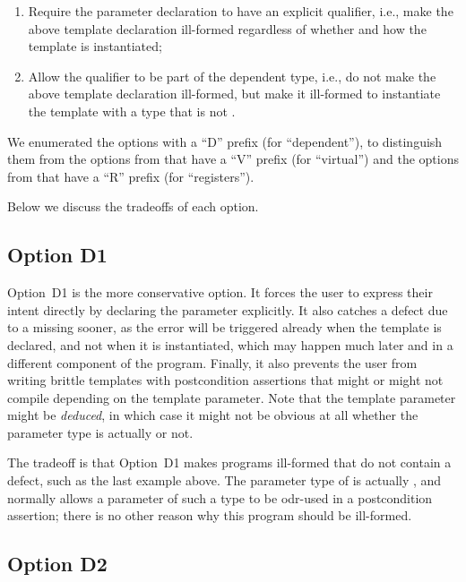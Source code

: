 \begin{enumerate}
\item Require the parameter declaration to have an explicit  qualifier, i.e., make the above template declaration ill-formed regardless of whether and how the template is instantiated;
\item Allow the  qualifier to be part of the dependent type, i.e., do not make the above template declaration ill-formed, but make it ill-formed to instantiate the template with a type that is not .
\end{enumerate}

We enumerated the options with a ``D'' prefix (for ``dependent''), to distinguish them from the options from \cite{D3484R1} that have a ``V'' prefix (for ``virtual'') and the options from \cite{D3487R0} that have a ``R'' prefix (for ``registers'').

Below we discuss the tradeoffs of each option.

\subsection*{Option D1}

Option~D1 is the more conservative option. It forces the user to express their intent directly by  declaring the parameter  explicitly. It also catches a defect due to a missing  sooner, as the error will be triggered already when the template is declared, and not when it is instantiated, which may happen much later and in a different component of the program. Finally, it also prevents the user from writing brittle templates with postcondition assertions that might or might not compile depending on the template parameter. Note that the template parameter might be \emph{deduced}, in which case it might not be obvious at all whether the parameter type is actually  or not.

The tradeoff is that Option~D1 makes programs ill-formed that do not contain a defect, such as the last example above. The parameter type of  is actually , and \cite{P2900R10} normally allows a parameter of such a type to be odr-used in a postcondition assertion; there is no other reason why this program should be ill-formed.

\subsection*{Option D2}

